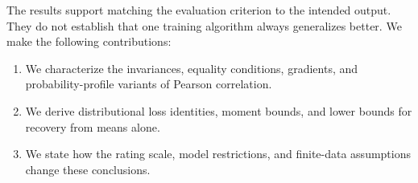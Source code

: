 The results support matching the evaluation criterion to the intended output.
They do not establish that one training algorithm always generalizes better.
We make the following contributions:
\begin{enumerate}
\item We characterize the invariances, equality conditions, gradients, and probability-profile variants of Pearson correlation.
\item We derive distributional loss identities, moment bounds, and lower bounds for recovery from means alone.
\item We state how the rating scale, model restrictions, and finite-data assumptions change these conclusions.
\end{enumerate}
